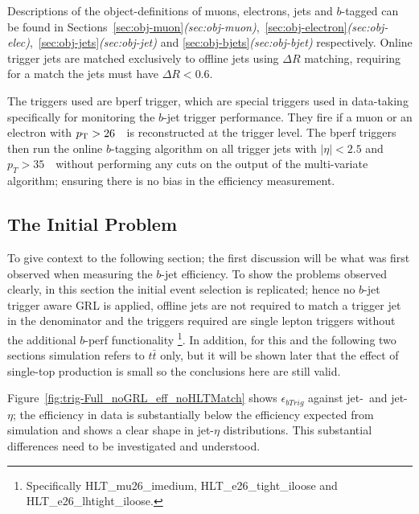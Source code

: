 Descriptions of the object-definitions of muons, electrons, jets and $b$-tagged can be found in
Sections~\ref{sec:obj-muon}\textit{(sec:obj-muon)},~\ref{sec:obj-electron}\textit{(sec:obj-elec)},~\ref{sec:obj-jets}\textit{(sec:obj-jet)}
and \ref{sec:obj-bjets}\textit{(sec:obj-bjet)} respectively.
Online trigger jets are matched exclusively to offline jets using $\Delta R$ matching, requiring for a match the jets must have $\Delta R<0.6$.

The triggers used are bperf trigger, which are special triggers used in data-taking specifically for monitoring the $b$-jet trigger performance.
They fire if a muon or an electron with $p_{\mathrm{T}} > 26$~\GeV~is reconstructed at the trigger level.
The bperf triggers then run the online $b$-tagging algorithm on all trigger jets with $|\eta|<2.5$ and
$p_{T}>35$~\GeV~without performing any cuts on the output of the multi-variate algorithm; ensuring there is no bias in the efficiency measurement. 


\newpage

\subsection{The Initial Problem}
\label{sec:trig-initProb}

To give context to the following section;
the first discussion will be what was first observed when measuring the $b$-jet efficiency.
To show the problems observed clearly, in this section the initial event selection is replicated;
hence  no $b$-jet trigger aware GRL is applied, offline jets are not required to match a trigger jet in the denominator
and the triggers required are single lepton triggers without the additional $b$-perf functionality
\footnote{Specifically HLT\_mu26\_imedium, HLT\_e26\_tight\_iloose and HLT\_e26\_lhtight\_iloose. }.
In addition, for this and the following two sections simulation refers to $t\bar{t}$ only,
but it will be shown later that the effect of single-top production is small so the conclusions here are still valid. 

Figure~\ref{fig:trig-Full_noGRL_eff_noHLTMatch} shows $\epsilon_{bTrig}$ against jet-\pT~and jet-$\eta$;
the efficiency in data is substantially below the efficiency expected from simulation and shows a clear shape in jet-$\eta$ distributions.
This substantial differences need to be investigated and understood. 

